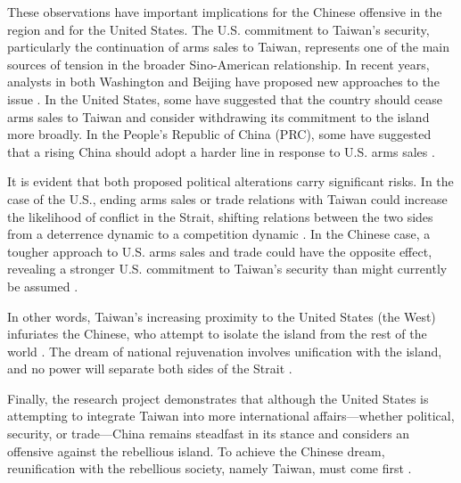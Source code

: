 \documentclass{article}
\begin{document}
These observations have important implications for the Chinese offensive in the region and for the United States. The U.S. commitment to Taiwan's security, particularly the continuation of arms sales to Taiwan, represents one of the main sources of tension in the broader Sino-American relationship. In recent years, analysts in both Washington and Beijing have proposed new approaches to the issue \citep{haass_sacks_american_support_taiwan}. In the United States, some have suggested that the country should cease arms sales to Taiwan and consider withdrawing its commitment to the island more broadly. In the People's Republic of China (PRC), some have suggested that a rising China should adopt a harder line in response to U.S. arms sales \citep{haass_sacks_american_support_taiwan}.

It is evident that both proposed political alterations carry significant risks. In the case of the U.S., ending arms sales or trade relations with Taiwan could increase the likelihood of conflict in the Strait, shifting relations between the two sides from a deterrence dynamic to a competition dynamic \citep{lee_siu_taiwan_leader_hawaii_stopover}. In the Chinese case, a tougher approach to U.S. arms sales and trade could have the opposite effect, revealing a stronger U.S. commitment to Taiwan's security than might currently be assumed \citep{panda_taipei_slams_chinese_air_force_fighters}.

In other words, Taiwan's increasing proximity to the United States (the West) infuriates the Chinese, who attempt to isolate the island from the rest of the world \citep{wenzhao_taiwan_policy_obama_administration}. The dream of national rejuvenation involves unification with the island, and no power will separate both sides of the Strait \citep{silk_is_taiwan_part_of_chinese_dream, xinhua_xi_steadfast_on_reunification}.

Finally, the research project demonstrates that although the United States is attempting to integrate Taiwan into more international affairs—whether political, security, or trade—China remains steadfast in its stance and considers an offensive against the rebellious island. To achieve the Chinese dream, reunification with the rebellious society, namely Taiwan, must come first \citep{huang_xi_jinping_taiwan_policy}.



\end{document}
